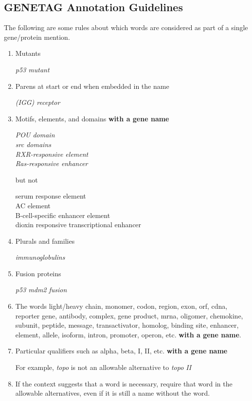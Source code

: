 
\subsection{GENETAG Annotation Guidelines}

The following are some rules about which words are considered as part of a single gene/protein mention.

\begin{enumerate}

\item Mutants

\emph{p53 mutant}

\item Parens at start or end when embedded in the name

\emph{(IGG) receptor}

\item Motifs, elements, and domains \textbf{with a gene name}

\emph{POU domain\\
src domains\\
RXR-responsive element\\
Ras-responsive enhancer}

but not

serum response element\\
AC element\\
B-cell-specific enhancer element\\
dioxin responsive transcriptional enhancer

\item Plurals and families

\emph{immunoglobulins}

\item Fusion proteins

\emph{p53 mdm2 fusion}

\item The words light/heavy chain, monomer, codon, region, exon, orf, cdna, reporter gene,
antibody, complex, gene product, mrna, oligomer, chemokine, subunit, peptide, message,
transactivator, homolog, binding site, enhancer, element, allele, isoform, intron,
promoter, operon, etc. \textbf{with a gene name}.

\item Particular qualifiers such as alpha, beta, I, II, etc. \textbf{with a gene name}

For example, \emph{topo} is not an allowable alternative to \emph{topo II}

\item If the context suggests that a word is necessary, require that word in the allowable
alternatives, even if it is still a name without the word.


\end{enumerate}
